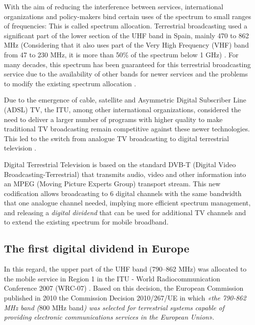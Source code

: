 
With the aim of reducing the interference between services, international organizations and policy-makers bind certain uses of the spectrum to small ranges of frequencies: This is called spectrum allocation. Terrestrial broadcasting used a significant part of the lower section of the UHF band in Spain, mainly 470 to 862 MHz (Considering that it also uses part of the Very High Frequency (VHF) band from 47 to 230 MHz, it is more than 50$\%$  of the spectrum below 1 GHz) \cite{1-02}. For many decades, this spectrum has been guaranteed for this terrestrial broadcasting service due to the availability of other bands for newer services and the problems to modify the existing spectrum allocation \cite{1-03}.\par

Due to the emergence of cable, satellite and Asymmetric Digital Subscriber Line (ADSL) TV, the ITU, among other international organizations, considered the need to deliver a larger number of programs with higher quality to make traditional TV broadcasting remain competitive against these newer technologies. This led to the switch from analogue TV broadcasting to digital terrestrial television \cite{1-03}.\par

Digital Terrestrial Television is based on the standard DVB-T (Digital Video Broadcasting-Terrestrial) that transmits audio, video and other information into an MPEG (Moving Picture Experts Group) transport stream. This new codification allows broadcasting to 6 digital channels with the same bandwidth that one analogue channel needed, implying more efficient spectrum management, and releasing a \textit{digital dividend} that can be used for additional TV channels and to extend the existing spectrum for mobile broadband.\par

\subsection*{The first digital dividend in Europe}
In this regard, the upper part of the UHF band (790–862 MHz) was allocated to the mobile service in Region 1 in the ITU - World Radiocommunication Conference 2007 (WRC-07) \cite{1-04}. Based on this decision, the European Commission published in 2010 the Commission Decision 2010/267/UE \cite{1-05} in which \textit{«the 790-862 MHz band (}800 MHz band\textit{) was selected for terrestrial systems capable of providing electronic communications services in the European Union}».\par

